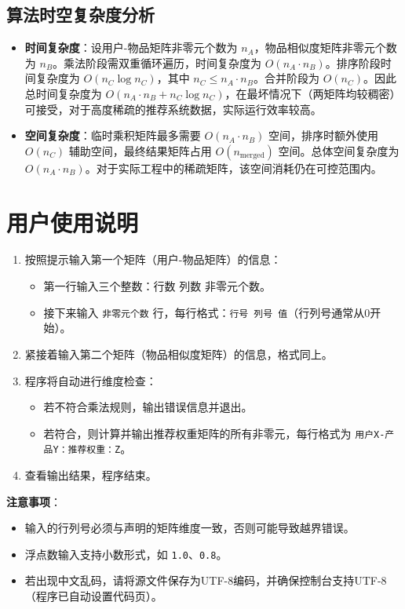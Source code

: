 \documentclass[UTF8]{ctexart}
\begin{document}
\subsection{算法时空复杂度分析}
\begin{itemize}
    \item \textbf{时间复杂度}：设用户-物品矩阵非零元个数为 $n_A$，物品相似度矩阵非零元个数为 $n_B$。乘法阶段需双重循环遍历，时间复杂度为 $O(n_A \cdot n_B)$。排序阶段时间复杂度为 $O(n_C \log n_C)$，其中 $n_C \le n_A \cdot n_B$。合并阶段为 $O(n_C)$。因此总时间复杂度为 $O(n_A \cdot n_B + n_C \log n_C)$，在最坏情况下（两矩阵均较稠密）可接受，对于高度稀疏的推荐系统数据，实际运行效率较高。
    \item \textbf{空间复杂度}：临时乘积矩阵最多需要 $O(n_A \cdot n_B)$ 空间，排序时额外使用 $O(n_C)$ 辅助空间，最终结果矩阵占用 $O(n_{\text{merged}})$ 空间。总体空间复杂度为 $O(n_A \cdot n_B)$。对于实际工程中的稀疏矩阵，该空间消耗仍在可控范围内。
\end{itemize}

\section{用户使用说明}
\begin{enumerate}
    \item 按照提示输入第一个矩阵（用户-物品矩阵）的信息：
        \begin{itemize}
            \item 第一行输入三个整数：行数 列数 非零元个数。
            \item 接下来输入 \texttt{非零元个数} 行，每行格式：\texttt{行号 列号 值}（行列号通常从0开始）。
        \end{itemize}
    \item 紧接着输入第二个矩阵（物品相似度矩阵）的信息，格式同上。
    \item 程序将自动进行维度检查：
        \begin{itemize}
            \item 若不符合乘法规则，输出错误信息并退出。
            \item 若符合，则计算并输出推荐权重矩阵的所有非零元，每行格式为 \texttt{用户X-产品Y：推荐权重：Z}。
        \end{itemize}
    \item 查看输出结果，程序结束。
\end{enumerate}

\textbf{注意事项}：
\begin{itemize}
    \item 输入的行列号必须与声明的矩阵维度一致，否则可能导致越界错误。
    \item 浮点数输入支持小数形式，如 \texttt{1.0}、\texttt{0.8}。
    \item 若出现中文乱码，请将源文件保存为UTF-8编码，并确保控制台支持UTF-8（程序已自动设置代码页）。
\end{itemize}
\end{document}
